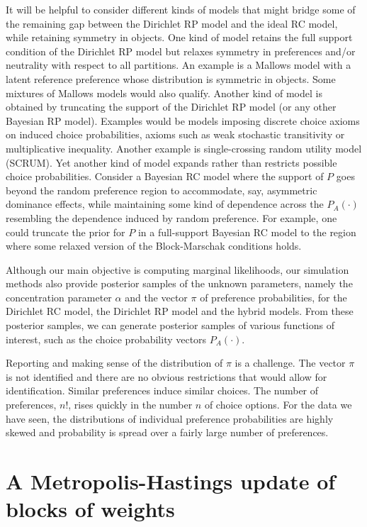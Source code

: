 \documentclass[11pt,letter]{article}
\newcommand{\Dpi}{Dirichlet RP model}
\newcommand{\DP}{Dirichlet RC model}
\begin{document}
It will be helpful to consider different kinds of models that might bridge some of the remaining gap between the \Dpi{} and the ideal RC model, while retaining symmetry in objects.
One kind of model retains the full support condition of the \Dpi{} but relaxes symmetry in preferences and/or neutrality with respect to all partitions.
An example is a Mallows model with a latent reference preference whose distribution is symmetric in objects.
Some mixtures of Mallows models would also qualify.
Another kind of model is obtained by truncating the support of the \Dpi{} (or any other Bayesian RP model).
Examples would be models imposing discrete choice axioms on induced choice probabilities, axioms such as weak stochastic transitivity or  multiplicative inequality.
Another example is  single-crossing random utility model (SCRUM).
Yet another kind of model expands rather than restricts possible choice probabilities.
Consider a Bayesian RC model where the support of $P$ goes beyond the random preference region to accommodate, say, asymmetric dominance effects, while maintaining some kind of dependence across the $P_A(\cdot)$ resembling the dependence induced by random preference.
For example, one could truncate the prior for $P$ in a full-support Bayesian RC model to the region where some relaxed version of the Block-Marschak conditions holds.

Although our main objective is computing marginal likelihoods, our simulation methods also provide posterior samples of the unknown parameters, namely the concentration parameter $\alpha$ and the vector $\pi$ of preference probabilities, for the \DP{}, the \Dpi{} and the hybrid models.
From these posterior samples, we can generate posterior samples of various functions of interest, such as the choice probability vectors $P_A(\cdot)$.

Reporting and making sense of the distribution of $\pi$ is a challenge.
The vector $\pi$ is not identified and there are no obvious restrictions that would allow for identification.
Similar preferences induce similar choices.
The number of preferences, $n!$, rises quickly in the number $n$ of choice options.
For the data we have seen, the distributions of individual preference probabilities are highly skewed and probability is spread over a fairly large number of preferences.

\appendix

\section{A Metropolis-Hastings update of blocks of weights}\label{s:gammadraw}
\end{document}
